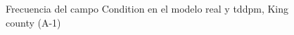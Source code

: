 \begin{figure}[H]
    \centering
    
    \caption{Frecuencia del campo Condition en el modelo real y tddpm, King county (A-1)}
    \label{frecuency-tddpm-condition}
\end{figure}